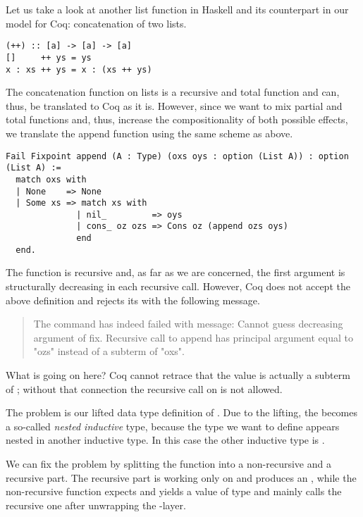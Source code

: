 Let us take a look at another list function in Haskell and its
counterpart in our model for Coq: concatenation of two lists.

\begin{verbatim}
(++) :: [a] -> [a] -> [a]
[]     ++ ys = ys
x : xs ++ ys = x : (xs ++ ys)
\end{verbatim}

The concatenation function on lists is a recursive and total function
and can, thus, be translated to Coq as it is.
However, since we want to mix partial and total functions and, thus,
increase the compositionality of both possible effects, we translate
the append function using the same scheme as above.

\begin{verbatim}
Fail Fixpoint append (A : Type) (oxs oys : option (List A)) : option (List A) :=
  match oxs with
  | None    => None
  | Some xs => match xs with
              | nil_         => oys
              | cons_ oz ozs => Cons oz (append ozs oys)
              end
  end.
\end{verbatim}

The function  is recursive and, as far as we
are concerned, the first argument is structurally decreasing in each
recursive call.
However, Coq does not accept the above definition and rejects its with
the following message.

\begin{quote}
The command has indeed failed with message: Cannot guess decreasing
argument of fix.
Recursive call to append has principal argument equal to "ozs" instead of a subterm of "oxs".
\end{quote}

What is going on here?
Coq cannot retrace that the value  is actually a
subterm of ; without that connection the
recursive call on  is not allowed.

The problem is our lifted data type definition of
.
Due to the lifting, the  becomes a so-called
\emph{nested inductive} type, because the type we want to define
appears nested in another inductive type.
In this case the other inductive type is .

We can fix the problem by splitting the function into a non-recursive
and a recursive part.
The recursive part is working only on  and
produces an , while the non-recursive
function expects and yields a value of type  and mainly calls the recursive one after unwrapping the
-layer.


